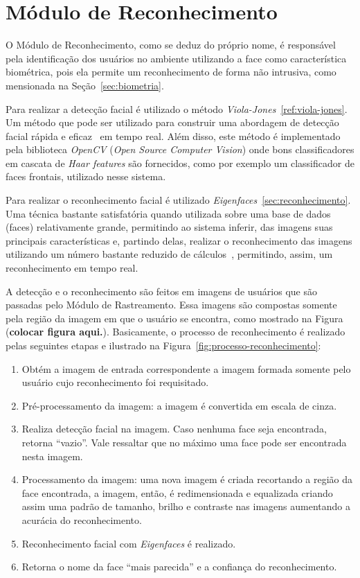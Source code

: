 \section{Módulo de Reconhecimento}

	O Módulo de Reconhecimento, como se deduz do próprio nome, é responsável pela identificação dos usuários no ambiente utilizando a face como característica biométrica, pois ela permite um reconhecimento de forma não intrusiva, como mensionada na Seção~\ref{sec:biometria}. 

	Para realizar a detecção facial é utilizado o método \textit{Viola-Jones}~\ref{ref:viola-jones}. Um método que pode ser utilizado para construir uma abordagem de detecção facial rápida e eficaz~\cite{violajones} em tempo real. Além disso, este método é implementado pela biblioteca \textit{OpenCV} (\textit{Open Source Computer Vision}) onde bons classificadores em cascata de \textit{Haar features} são fornecidos, como por exemplo um classificador de faces frontais, utilizado nesse sistema.

	Para realizar o reconhecimento facial é utilizado \textit{Eigenfaces}~\ref{sec:reconhecimento}. Uma técnica bastante satisfatória quando utilizada sobre uma base de dados (faces) relativamente grande, permitindo ao sistema inferir, das imagens suas principais características e, partindo delas, realizar o reconhecimento das imagens utilizando um número bastante reduzido de cálculos~\cite{artigo-eigenface}, permitindo, assim, um reconhecimento em tempo real.

	A detecção e o reconhecimento são feitos em imagens de usuários que são passadas pelo Módulo de Rastreamento. Essa imagens são compostas somente pela região da imagem em que o usuário se encontra, como mostrado na Figura (\textbf{colocar figura aqui.}). Basicamente, o processo de reconhecimento é realizado pelas seguintes etapas e ilustrado na Figura~\ref{fig:processo-reconhecimento}:

		\begin{enumerate}
			\item Obtém a imagem de entrada correspondente a imagem formada somente pelo usuário cujo reconhecimento foi requisitado.
			\item Pré-processamento da imagem: a imagem é convertida em escala de cinza.
			\item Realiza detecção facial na imagem. Caso nenhuma face seja encontrada, retorna ``vazio''. Vale ressaltar que no máximo uma face pode ser encontrada nesta imagem.
			\item Processamento da imagem: uma nova imagem é criada recortando a região da face encontrada, a imagem, então, é redimensionada e equalizada criando assim uma padrão de tamanho, brilho e contraste nas imagens aumentando a acurácia do reconhecimento.
			\item Reconhecimento facial com \textit{Eigenfaces} é realizado.
			\item Retorna o nome da face ``mais parecida'' e a confiança do reconhecimento.
		\end{enumerate}

